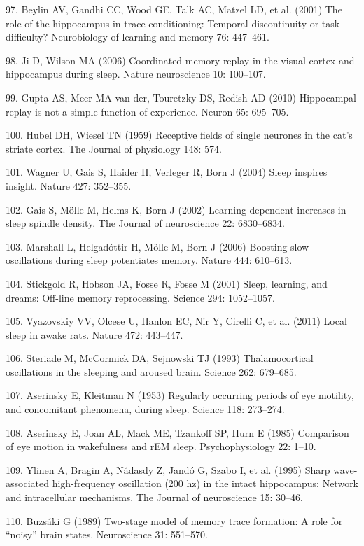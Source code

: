 \documentclass[]{article}
\begin{document}
97. Beylin AV, Gandhi CC, Wood GE, Talk AC, Matzel LD, et al. (2001) The
role of the hippocampus in trace conditioning: Temporal discontinuity or
task difficulty? Neurobiology of learning and memory 76: 447--461.

98. Ji D, Wilson MA (2006) Coordinated memory replay in the visual
cortex and hippocampus during sleep. Nature neuroscience 10: 100--107.

99. Gupta AS, Meer MA van der, Touretzky DS, Redish AD (2010)
Hippocampal replay is not a simple function of experience. Neuron 65:
695--705.

100. Hubel DH, Wiesel TN (1959) Receptive fields of single neurones in
the cat's striate cortex. The Journal of physiology 148: 574.

101. Wagner U, Gais S, Haider H, Verleger R, Born J (2004) Sleep
inspires insight. Nature 427: 352--355.

102. Gais S, M{ö}lle M, Helms K, Born J (2002) Learning-dependent
increases in sleep spindle density. The Journal of neuroscience 22:
6830--6834.

103. Marshall L, Helgad{ó}ttir H, M{ö}lle M, Born J (2006) Boosting slow
oscillations during sleep potentiates memory. Nature 444: 610--613.

104. Stickgold R, Hobson JA, Fosse R, Fosse M (2001) Sleep, learning,
and dreams: Off-line memory reprocessing. Science 294: 1052--1057.

105. Vyazovskiy VV, Olcese U, Hanlon EC, Nir Y, Cirelli C, et al. (2011)
Local sleep in awake rats. Nature 472: 443--447.

106. Steriade M, McCormick DA, Sejnowski TJ (1993) Thalamocortical
oscillations in the sleeping and aroused brain. Science 262: 679--685.

107. Aserinsky E, Kleitman N (1953) Regularly occurring periods of eye
motility, and concomitant phenomena, during sleep. Science 118:
273--274.

108. Aserinsky E, Joan AL, Mack ME, Tzankoff SP, Hurn E (1985)
Comparison of eye motion in wakefulness and rEM sleep. Psychophysiology
22: 1--10.

109. Ylinen A, Bragin A, N{á}dasdy Z, Jand{ó} G, Szabo I, et al. (1995)
Sharp wave-associated high-frequency oscillation (200 hz) in the intact
hippocampus: Network and intracellular mechanisms. The Journal of
neuroscience 15: 30--46.

110. Buzs{á}ki G (1989) Two-stage model of memory trace formation: A
role for ``noisy'' brain states. Neuroscience 31: 551--570.
\end{document}
